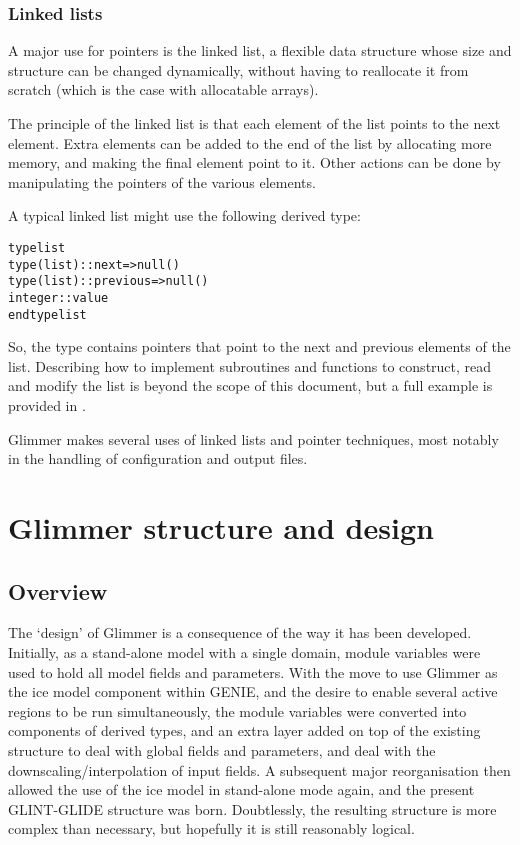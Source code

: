 \subsubsection{Linked lists}
%
A major use for pointers is the linked list, a flexible data structure whose
size and structure can be changed dynamically, without having to reallocate it
from scratch (which is the case with allocatable arrays).

The principle of the linked list is that each element of the list points to
the next element. Extra elements can be added to the end of the list by
allocating more memory, and making the final element point to it. Other
actions can be done by manipulating the pointers of the various elements.

A typical linked list might use the following derived type:
%
\begin{alltt}
    type list
        type(list) :: next => null()
        type(list) :: previous => null()
        integer :: value
    end type list
\end{alltt}
%
So, the type contains pointers that point to the next and previous elements
of the list. Describing how to implement subroutines and functions to
construct, read and modify the list is beyond the scope of this document, but
a full example is provided in \cite{Metcalf1999}.

Glimmer makes several uses of linked lists and pointer techniques, most
notably in the handling of configuration and output files.
%
\section{Glimmer structure and design}
%
\subsection{Overview}
%
The `design' of Glimmer is a consequence of the way it has been
developed. Initially, as a stand-alone model with a single domain, module
variables were used to hold all model fields and parameters. With the move to
use Glimmer as the ice model component within GENIE, and the desire to enable
several active regions to be run simultaneously, the module variables were
converted into components of derived types, and an extra layer added on top of
the existing structure to deal with global fields and parameters, and deal
with the downscaling/interpolation of input fields. A subsequent major
reorganisation then allowed the use of the ice model in stand-alone mode
again, and the present GLINT-GLIDE structure was born. Doubtlessly, the
resulting structure is more complex than necessary, but hopefully it is still
reasonably logical.

